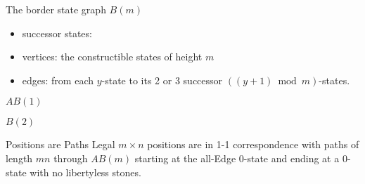\documentclass{prosper}
\begin{document}
\begin{slide}{The border state graph $B(m)$}
\begin{itemize}
\item successor states: {\epsfxsize=9cm }
\item vertices: the constructible states of height $m$
\item edges: from each $y$-state to its 2 or 3 successor $((y+1)\bmod m)$-states.
\end{itemize}
\end{slide}%

\begin{slide}{$AB(1)$}
{\epsfxsize=10cm }
\end{slide}%

\begin{slide}{$B(2)$}
{\epsfxsize=10cm }
\end{slide}%

\begin{slide}{Positions are Paths}
Legal $m \times n$ positions are in 1-1 correspondence with paths
of length $mn$ through $AB(m)$ starting at the all-Edge $0$-state
and ending at a $0$-state with no libertyless stones. \\
{\epsfxsize=10cm }
\end{slide}%
\end{document}
